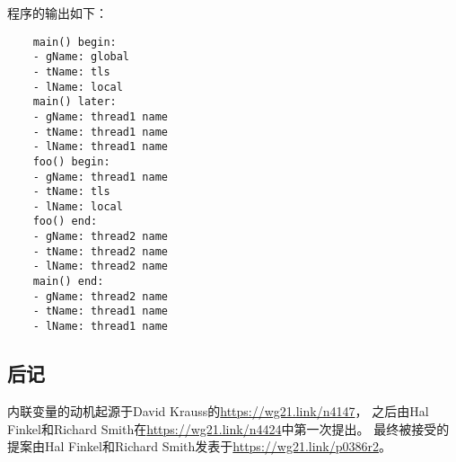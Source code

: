 程序的输出如下：
\begin{lstlisting}
    main() begin:
    - gName: global
    - tName: tls
    - lName: local
    main() later:
    - gName: thread1 name
    - tName: thread1 name
    - lName: thread1 name
    foo() begin:
    - gName: thread1 name
    - tName: tls
    - lName: local
    foo() end:
    - gName: thread2 name
    - tName: thread2 name
    - lName: thread2 name
    main() end:
    - gName: thread2 name
    - tName: thread1 name
    - lName: thread1 name
\end{lstlisting}

\subsection{后记}
内联变量的动机起源于David Krauss的\url{https://wg21.link/n4147}，
之后由Hal Finkel和Richard Smith在\url{https://wg21.link/n4424}中第一次提出。
最终被接受的提案由Hal Finkel和Richard Smith发表于\url{https://wg21.link/p0386r2}。